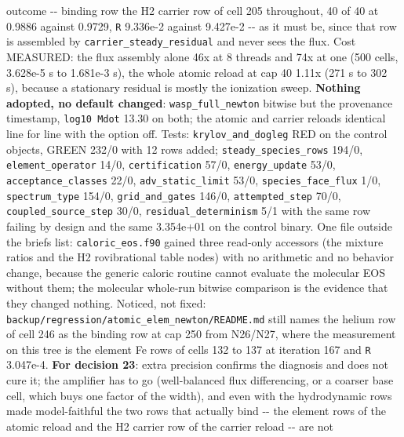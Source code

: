 \documentclass[english,a4paper]{my_memo}
\begin{document}
\begin{itemize}
  outcome -\/- binding row the H2 carrier row of cell 205 throughout, 40 of
  40 at 0.9886 against 0.9729, \texttt{\textbar{}\textbar{}R\textbar{}\textbar{}} 9.336e-2 against 9.427e-2 -\/- as it
  must be, since that row is assembled by \texttt{carrier\_steady\_residual} and
  never sees the flux. Cost MEASURED: the flux assembly alone 46x at 8
  threads and 74x at one (500 cells, 3.628e-5 s to 1.681e-3 s), the whole
  atomic reload at cap 40 1.11x (271 s to 302 s), because a stationary
  residual is mostly the ionization sweep. \textbf{Nothing adopted, no default
  changed}: \texttt{wasp\_full\_newton} bitwise but the provenance timestamp,
  \texttt{log10\ Mdot} 13.30 on both; the atomic and carrier reloads identical
  line for line with the option off. Tests: \texttt{krylov\_and\_dogleg} RED on the
  control objects, GREEN 232/0 with 12 rows added; \texttt{steady\_species\_rows}
  194/0, \texttt{element\_operator} 14/0, \texttt{certification} 57/0, \texttt{energy\_update}
  53/0, \texttt{acceptance\_classes} 22/0, \texttt{adv\_static\_limit} 53/0,
  \texttt{species\_face\_flux} 1/0, \texttt{spectrum\_type} 154/0, \texttt{grid\_and\_gates} 146/0,
  \texttt{attempted\_step} 70/0, \texttt{coupled\_source\_step} 30/0,
  \texttt{residual\_determinism} 5/1 with the same row failing by design and the
  same 3.354e+01 on the control binary. One file outside the brief\textquotesingle s list:
  \texttt{caloric\_eos.f90} gained three read-only accessors (the mixture ratios
  and the H2 rovibrational table nodes) with no arithmetic and no behavior
  change, because the generic caloric routine cannot evaluate the
  molecular EOS without them; the molecular whole-run bitwise comparison is
  the evidence that they changed nothing. Noticed, not fixed:
  \texttt{backup/regression/atomic\_elem\_newton/README.md} still names the helium
  row of cell 246 as the binding row at cap 250 from N26/N27, where the
  measurement on this tree is the element Fe rows of cells 132 to 137 at
  iteration 167 and \texttt{\textbar{}\textbar{}R\textbar{}\textbar{}} 3.047e-4. \textbf{For decision 23}: extra precision
  confirms the diagnosis and does not cure it; the amplifier has to go
  (well-balanced flux differencing, or a coarser base cell, which buys one
  factor of the width), and even with the hydrodynamic rows made
  model-faithful the two rows that actually bind -\/- the element rows of the
  atomic reload and the H2 carrier row of the carrier reload -\/- are not

\end{itemize}
\end{document}
